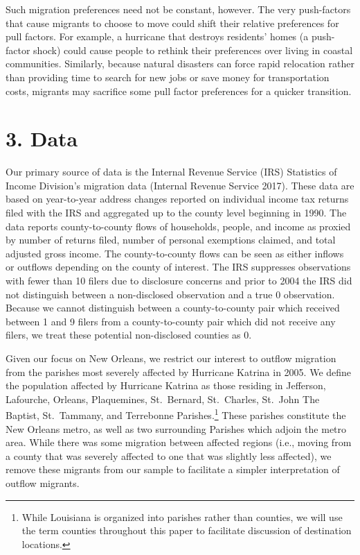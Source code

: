 \documentclass[]{article}
\begin{document}
Such migration preferences need not be constant, however. The very
push-factors that cause migrants to choose to move could shift their
relative preferences for pull factors. For example, a hurricane that
destroys residents' homes (a push-factor shock) could cause people to
rethink their preferences over living in coastal communities. Similarly,
because natural disasters can force rapid relocation rather than
providing time to search for new jobs or save money for transportation
costs, migrants may sacrifice some pull factor preferences for a quicker
transition.

\section{3. Data}\label{data}

Our primary source of data is the Internal Revenue Service (IRS)
Statistics of Income Division's migration data (Internal Revenue Service
2017). These data are based on year-to-year address changes reported on
individual income tax returns filed with the IRS and aggregated up to
the county level beginning in 1990. The data reports county-to-county
flows of households, people, and income as proxied by number of returns
filed, number of personal exemptions claimed, and total adjusted gross
income. The county-to-county flows can be seen as either inflows or
outflows depending on the county of interest. The IRS suppresses
observations with fewer than 10 filers due to disclosure concerns and
prior to 2004 the IRS did not distinguish between a non-disclosed
observation and a true 0 observation. Because we cannot distinguish
between a county-to-county pair which received between 1 and 9 filers
from a county-to-county pair which did not receive any filers, we treat
these potential non-disclosed counties as 0.

Given our focus on New Orleans, we restrict our interest to outflow
migration from the parishes most severely affected by Hurricane Katrina
in 2005. We define the population affected by Hurricane Katrina as those
residing in Jefferson, Lafourche, Orleans, Plaquemines, St.~Bernard,
St.~Charles, St.~John The Baptist, St.~Tammany, and Terrebonne
Parishes.\footnote{While Louisiana is organized into parishes rather
  than counties, we will use the term counties throughout this paper to
  facilitate discussion of destination locations.} These parishes
constitute the New Orleans metro, as well as two surrounding Parishes
which adjoin the metro area. While there was some migration between
affected regions (i.e., moving from a county that was severely affected
to one that was slightly less affected), we remove these migrants from
our sample to facilitate a simpler interpretation of outflow migrants.
\end{document}
